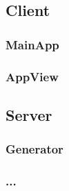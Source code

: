 





\subsection{Client}

\subsubsection{MainApp}

\subsubsection{AppView}




\subsection{Server}

\subsubsection{Generator}

\subsubsection{...}
